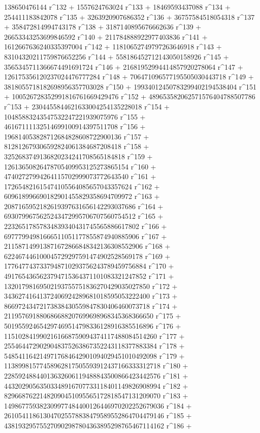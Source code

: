        138650476144 r^132 + 1557624763024 r^133 + 
       18469593437088 r^134 + 254411183842078 r^135 + 
       3263920907686352 r^136 + 36757584518054318 r^137 + 
       358472814994743178 r^138 + 3187140895676662636 r^139 + 
       26653343253699846592 r^140 + 211784888922977403836 r^141 + 
       1612667636240335397004 r^142 + 11810652749797263646918 r^143 + 
       83104320211759876652256 r^144 + 
       558186452712143050158926 r^145 + 
       3565345711366674491691724 r^146 + 
       21681952994414857920278064 r^147 + 
       126175356120237024476777284 r^148 + 
       706471096577195505030443718 r^149 + 
       3818055718182698956357703028 r^150 + 
       19934012450783299402194538404 r^151 + 
       100526728352991816761669429476 r^152 + 
       489653582062571576404788507786 r^153 + 
       2304455844621633004254135228018 r^154 + 
       10485883243547532247221939075976 r^155 + 
       46167111132514699100914397511708 r^156 + 
       196814053828712684828608722900136 r^157 + 
       812812679306592824061384687208418 r^158 + 
       3252683749136820234241708565184818 r^159 + 
       12613650826478705409953125273865154 r^160 + 
       47402727994264115702999073772643540 r^161 + 
       172654821615474105564085657043357624 r^162 + 
       609618996690182901455829358694709972 r^163 + 
       2087165952182619397631656142293037686 r^164 + 
       6930799675625243472995706707560754512 r^165 + 
       22326517857834839340431745565886617802 r^166 + 
       69777994981666511051177855874940885906 r^167 + 
       211587149913871672866848342136308552906 r^168 + 
       622467446100045729297591474902528569178 r^169 + 
       1776477437337948710293756243789459756884 r^170 + 
       4917654365623794715364371101083321247852 r^171 + 
       13201798169502193755751836270429035027850 r^172 + 
       34362741641372406924289681018595053222400 r^173 + 
       86697243472173838430559847830406460073718 r^174 + 
       211957691880686688207699698968345368366650 r^175 + 
       501955924654297469514798336128916385516896 r^176 + 
       1151028419902161668759094374117488084514260 r^177 + 
       2554644729029048375263867352243118377883384 r^178 + 
       5485411642149717684642901094029451010492098 r^179 + 
       11389981577458962817505593912437166333312718 r^180 + 
       22859248844013632606119488843500866423442576 r^181 + 
       44320290563503348916707733118401149826908994 r^182 + 
       82966876221482090451095565172818547131209070 r^183 + 
       149867759382309977484400126446970202252679036 r^184 + 
       261054118613047025578838479589552864704479146 r^185 + 
       438193295755270902987804363895298765467114162 r^186 + 
